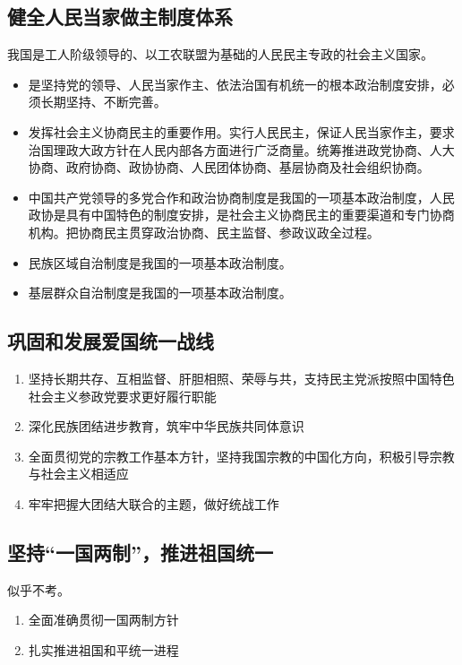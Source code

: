     \subsection{健全人民当家做主制度体系}
        我国是工人阶级领导的、以工农联盟为基础的人民民主专政的社会主义国家。
        \begin{itemize}
            \item {}是坚持党的领导、人民当家作主、依法治国有机统一的根本政治制度安排，必须长期坚持、不断完善。
            \item 发挥社会主义协商民主的重要作用。实行人民民主，保证人民当家作主，要求治国理政大政方针在人民内部各方面进行广泛商量。统筹推进政党协商、人大协商、政府协商、政协协商、人民团体协商、基层协商及社会组织协商。
            \item 中国共产党领导的多党合作和政治协商制度是我国的一项基本政治制度，人民政协是具有中国特色的制度安排，是社会主义协商民主的重要渠道和专门协商机构。把协商民主贯穿政治协商、民主监督、参政议政全过程。
            \item 民族区域自治制度是我国的一项基本政治制度。
            \item 基层群众自治制度是我国的一项基本政治制度。
        \end{itemize}

    \subsection{巩固和发展爱国统一战线}
        \begin{enumerate}
            \item 坚持长期共存、互相监督、肝胆相照、荣辱与共，支持民主党派按照中国特色社会主义参政党要求更好履行职能
            \item 深化民族团结进步教育，筑牢中华民族共同体意识
            \item 全面贯彻党的宗教工作基本方针，坚持我国宗教的中国化方向，积极引导宗教与社会主义相适应
            \item 牢牢把握大团结大联合的主题，做好统战工作
        \end{enumerate}

    \subsection{坚持“一国两制”，推进祖国统一}
        似乎不考。
        \begin{enumerate}
            \item 全面准确贯彻一国两制方针
            \item 扎实推进祖国和平统一进程
        \end{enumerate}



